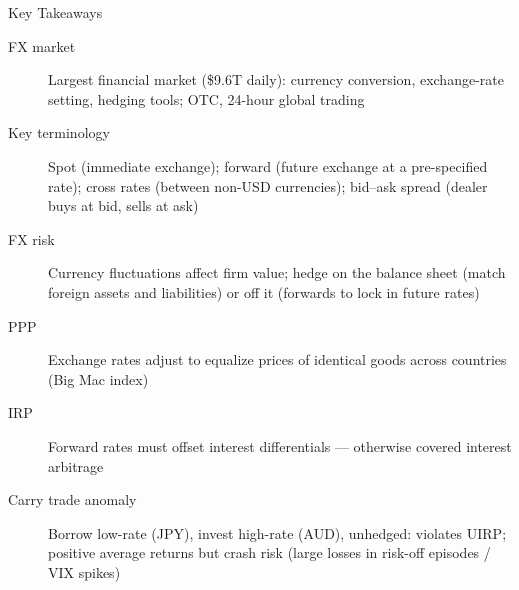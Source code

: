 \documentclass[aspectratio=169]{beamer}
\begin{document}

\begin{frame}{Key Takeaways}
\begin{description}
  \item[FX market] Largest financial market (\$9.6T daily): currency conversion, exchange-rate setting, hedging tools; OTC, 24-hour global trading
  \item[Key terminology] Spot (immediate exchange); forward (future exchange at a pre-specified rate); cross rates (between non-USD currencies); bid--ask spread (dealer buys at bid, sells at ask)
  \item[FX risk] Currency fluctuations affect firm value; hedge on the balance sheet (match foreign assets and liabilities) or off it (forwards to lock in future rates)
  \item[PPP] Exchange rates adjust to equalize prices of identical goods across countries (Big Mac index)
  \item[IRP] Forward rates must offset interest differentials --- otherwise covered interest arbitrage
  \item[Carry trade anomaly] Borrow low-rate (JPY), invest high-rate (AUD), unhedged: violates UIRP; positive average returns but crash risk (large losses in risk-off episodes / VIX spikes)
\end{description}
\end{frame}
\end{document}
